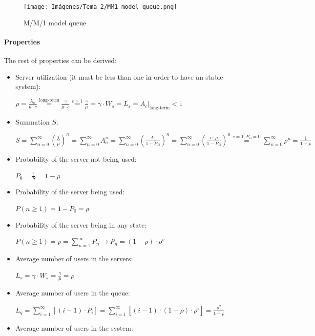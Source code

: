 \documentclass[
	12pt,
	twoside
]{book}
\begin{document}
\begin{figure}[H]
	\centering
	\texttt{[image: Imágenes/Tema 2/MM1 model queue.png]}
	\caption{
		\label{fig:unit2_MM1_queue}
		M/M/1 model queue
	}
\end{figure}

\paragraph{Properties}

The rest of properties can be derived:

\begin{itemize}
	\item {
		Server utilization (it must be less than one in order to have an stable system):

		$
			\rho =
			\frac {\lambda_a} {\mu \cdot c} \overset {\textrm{long-term}} {=}
			\frac {\gamma} {\mu \cdot c} \overset {c=1} {=}
			\frac {\gamma} {\mu} =
			\gamma \cdot W_s =
			L_s =
			\left. A_c \right|_{\textrm{long-term}} < 1
		$
	}
	\item {
		Summation $S$:

		$
			S =
			\sum_{n=0}^{\infty} \left( \frac {\lambda} {\mu} \right)^n =
			\sum_{n=0}^{\infty} A_o^n =
			\sum_{n=0}^{\infty} \left( \frac {A_c} {1 - P_B} \right)^n =
			\sum_{n=0}^{\infty} \left( \frac {c \cdot \rho} {1 - P_B} \right)^n \overset {c=1, P_B=0} {=}
			\sum_{n=0}^{\infty} \rho^n =
			\frac {1} {1 - \rho}
		$
	}
	\item {
		Probability of the server not being used:

		$
			P_0 = \frac {1} {S} = 1 - \rho
		$
	}
	\item {
		Probability of the server being used:

		$
			P(n \geq 1) = 1 - P_0 = \rho
		$
	}
	\item {
		Probability of the server being in any state:

		$
			P(n \geq 1) = \rho = \sum_{n=1}^{\infty} P_n \rightarrow P_n = (1 - \rho) \cdot \rho^n
		$
	}
	\item {
		Average number of users in the servers:

		$
			L_s = \gamma \cdot W_s = \frac {\gamma} {\mu} = \rho
		$
	}
	\item {
		Average number of users in the queue:

		$
			L_q = \sum_{i=1}^{\infty} \left[ (i-1) \cdot P_i \right] =
			\sum_{i=1}^{\infty} \left[ (i-1) \cdot (1-\rho) \cdot \rho^i \right] =
			\frac {\rho^2} {1-\rho}
		$
	}
	\item {
		Average number of users in the system:

}
\end{itemize}
\end{document}
